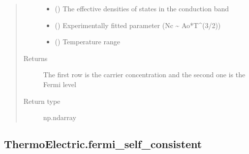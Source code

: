 \documentclass[letterpaper,10pt,english]{sphinxmanual}
\begin{document}
\begin{fulllineitems}
\begin{quote}
\begin{description}
\begin{itemize}
\item {} 
\sphinxAtStartPar
{} () \textendash{} The effective densities of states in the conduction band

\item {} 
\sphinxAtStartPar
{} () \textendash{} Experimentally fitted parameter (Nc \textasciitilde{} Ao*T\textasciicircum{}(3/2))

\item {} 
\sphinxAtStartPar
{} () \textendash{} Temperature range

\end{itemize}

\item[{Returns}] \leavevmode
\sphinxAtStartPar
{} \textendash{} The first row is the carrier concentration and the second one is the Fermi level

\item[{Return type}] \leavevmode
\sphinxAtStartPar
np.ndarray

\end{description}\end{quote}

\end{fulllineitems}



\subsection{ThermoElectric.fermi\_self\_consistent}
\label{\detokenize{autosummary/ThermoElectric.fermi_self_consistent:thermoelectric-fermi-self-consistent}}\label{\detokenize{autosummary/ThermoElectric.fermi_self_consistent::doc}}
\end{document}
